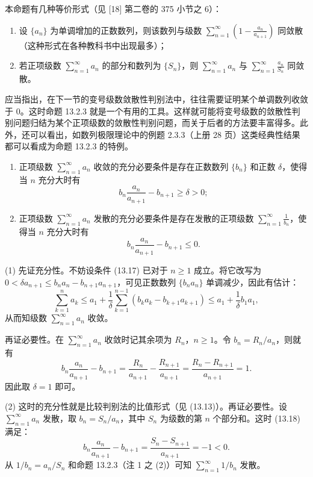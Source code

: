 \begin{xremark}
本命题有几种等价形式（见 [18] 第二卷的 375 小节之 6）：
\begin{enumerate}[label=(\arabic*)]
\item 设 $\{a_n\}$ 为单调增加的正数数列，则该数列与级数 $\sum_{n=1}^{\infty}\left(1-\frac{a_n}{a_{n+1}}\right)$ 同敛散（这种形式在各种教科书中出现最多）；
\item 若正项级数 $\sum_{n=1}^{\infty}a_n$ 的部分和数列为 $\{S_n\}$，则 $\sum_{n=1}^{\infty}a_n$ 与 $\sum_{n=1}^{\infty}\frac{a_n}{S_n}$ 同敛散。
\end{enumerate}
\end{xremark}

\begin{xremark}
应当指出，在下一节的变号级数敛散性判别法中，往往需要证明某个单调数列收敛于 0。这时命题 13.2.3 就是一个有用的工具。这样就可能将变号级数的敛散性判别问题归结为某个正项级数的敛散性判别问题，而关于后者的方法要丰富得多。此外，还可以看出，如数列极限理论中的例题 2.3.3（上册 28 页）这类经典性结果都可以看成为命题 13.2.3 的特例。
\end{xremark}

\begin{xproposition}
\begin{enumerate}[label=(\arabic*)]
\item 正项级数 $\sum_{n=1}^{\infty}a_n$ 收敛的充分必要条件是存在正数数列 $\{b_n\}$ 和正数 $\delta$，使得当 $n$ 充分大时有
\begin{equation}
b_n\frac{a_n}{a_{n+1}}-b_{n+1}\geq\delta>0;
\tag{13.17}
\end{equation}
\item 正项级数 $\sum_{n=1}^{\infty}a_n$ 发散的充分必要条件是存在发散的正项级数 $\sum_{n=1}^{\infty}\frac1{b_n}$，使得当 $n$ 充分大时有
\begin{equation}
b_n\frac{a_n}{a_{n+1}}-b_{n+1}\leq0.
\tag{13.18}
\end{equation}
\end{enumerate}
\end{xproposition}
\begin{xproof}
(1) 先证充分性。不妨设条件 (13.17) 已对于 $n\geq1$ 成立。将它改写为 $0<\delta a_{n+1}\leq b_na_n-b_{n+1}a_{n+1}$，可见正数数列 $\{b_na_n\}$ 单调减少，因此有估计：
\[
\sum_{k=1}^{n}a_k\leq a_1+\frac1\delta\sum_{k=1}^{n-1}(b_ka_k-b_{k+1}a_{k+1})\leq a_1+\frac1\delta b_1a_1,
\]
从而知级数 $\sum_{n=1}^{\infty}a_n$ 收敛。

再证必要性。在 $\sum_{n=1}^{\infty}a_n$ 收敛时记其余项为 $R_n$，$n\geq1$。令 $b_n=R_n/a_n$，则就有
\[
b_n\frac{a_n}{a_{n+1}}-b_{n+1}=\frac{R_n}{a_{n+1}}-\frac{R_{n+1}}{a_{n+1}}=\frac{R_n-R_{n+1}}{a_{n+1}}=1.
\]
因此取 $\delta=1$ 即可。

(2) 这时的充分性就是比较判别法的比值形式（见 (13.13)）。再证必要性。设 $\sum_{n=1}^{\infty}a_n$ 发散，取 $b_n=S_n/a_n$，其中 $S_n$ 为级数的第 $n$ 个部分和。这时 (13.18) 满足：
\[
b_n\frac{a_n}{a_{n+1}}-b_{n+1}=\frac{S_n-S_{n+1}}{a_{n+1}}=-1<0.
\]
从 $1/b_n=a_n/S_n$ 和命题 13.2.3（注 1 之 (2)）可知 $\sum_{n=1}^{\infty}1/b_n$ 发散。
\end{xproof}

